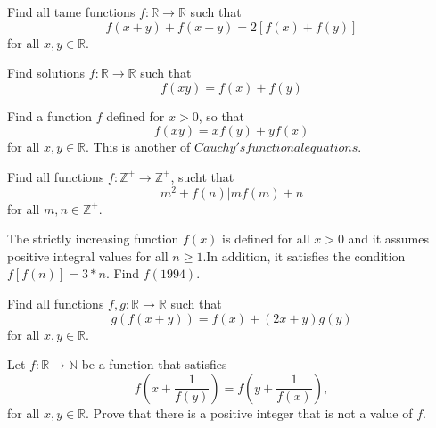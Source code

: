 \documentclass[11pt,a5paper]{article}
\begin{document}
\begin{enumerate}
\item{Find all tame functions $f: \mathbb{R} \to \mathbb{R}$  such that
\[f(x+y)+f(x-y)=2[f(x)+f(y)]\]
for all $x,y \in \mathbb{R}$.}

\item{Find solutions $f: \mathbb{R} \to \mathbb{R}$ such that
\[f(xy)=f(x)+f(y)\]


\item{Find a function $f$ defined for $x>0$, so that 
\[f(xy)=xf(y)+yf(x)\]}
for all $x,y \in \mathbb{R}$. This is another of $Cauchy's functional equations$.}

\item{Find all functions  $f: \mathbb{Z^+} \to \mathbb{Z^+}$, sucht that
\[m^2+f(n) | mf(m)+n\]
for all $m,n \in \mathbb{Z^+}$.}

\item{The strictly increasing function $f(x)$ is defined for all $x>0$ and it assumes positive integral values for all $n \geq 1$.In addition, it satisfies the condition $f[f(n)]=3*n$. Find $f(1994)$.}


\item{Find all functions $f,g: \mathbb{R} \to \mathbb{R}$ such that
\[g(f(x+y))=f(x)+(2x+y)g(y)\]
for all $x,y \in \mathbb{R}$.}

\item{Let $f: \mathbb{R} \to \mathbb{N}$ be a function that satisfies
\[f\left(x+\frac{1}{f(y)}\right)=f\left(y+\frac{1}{f(x)}\right),\]
for all $x,y\in \mathbb{R}$. Prove that there is a positive integer that is not a value of $f$.}


\end{enumerate}
\end{document}

